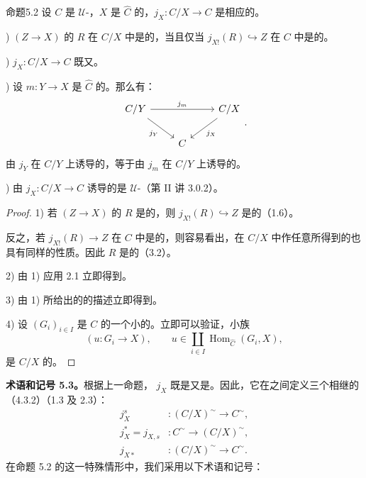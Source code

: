 \begin{SGAresult}{命题}{5.2}
设 $C$ 是 $\mathcal U$-，$X$ 是 $\widehat C$ 的，$j_X:C/X\to C$ 是相应的。

)  $(Z\to X)$ 的 $R$ 在 $C/X$ 中是的，当且仅当 $j_{X!}(R)\hookrightarrow Z$ 在 $C$ 中是的。

)  $j_X:C/X\to C$ 既又。

) 设 $m:Y\to X$ 是 $\widehat C$ 的。那么有：
\[
\begin{tikzcd}
 C/Y\arrow[rr,"j_m"]\arrow[dr,"j_Y"']&&C/X\arrow[dl,"j_X"]\\
 &C&
\end{tikzcd}.
\]
由 $j_Y$ 在 $C/Y$ 上诱导的，等于由 $j_m$ 在 $C/Y$ 上诱导的。

) 由 $j_X:C/X\to C$ 诱导的是 $\mathcal U$-（第 II 讲 3.0.2）。
\end{SGAresult}
\begin{proof}
1) 若 $(Z\to X)$ 的 $R$ 是的，则 $j_{X!}(R)\hookrightarrow Z$ 是的（1.6）。

反之，若 $j_{X!}(R)\to Z$ 在 $C$ 中是的，则容易看出，在 $C/X$ 中作任意所得到的也具有同样的性质。因此 $R$ 是的（3.2）。

2) 由 1) 应用 2.1 立即得到。

3) 由 1) 所给出的的描述立即得到。

4) 设 $(G_i)_{i\in I}$ 是 $C$ 的一个小的。立即可以验证，小族
\[
 (u:G_i\to X),\qquad u\in\coprod_{i\in I}\operatorname{Hom}_{\widehat C}(G_i,X),
\]
是 $C/X$ 的。
\end{proof}

\textbf{术语和记号 5.3。}根据上一命题， $j_X$ 既是又是。因此，它在之间定义三个相继的（4.3.2）（1.3 及 2.3）：
\[
\begin{aligned}
 j_X^s&:(C/X)^{\sim}\longrightarrow C^{\sim},\\
 j_X^*=j_{X,s}&:C^{\sim}\longrightarrow(C/X)^{\sim},\\
 j_{X*}&:(C/X)^{\sim}\longrightarrow C^{\sim}.
\end{aligned}
\]
在命题 5.2 的这一特殊情形中，我们采用以下术语和记号：

